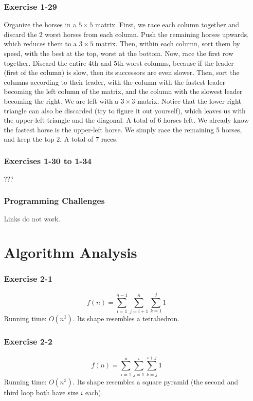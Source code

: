 \documentclass{book}
\begin{document}
\subsection*{Exercise 1-29}
Organize the horses in a $5 \times 5$ matrix. First, we race each column together and discard the 2 worst horses from each column. Push the remaining horses upwards, which reduces them to a $3 \times 5$ matrix. Then, within each column, sort them by speed, with the best at the top, worst at the bottom. Now, race the first row together. Discard the entire 4th and 5th worst columns, because if the leader (first of the column) is slow, then its successors are even slower. Then, sort the columns according to their leader, with the column with the fastest leader becoming the left column of the matrix, and the column with the slowest leader becoming the right. We are left with a $3 \times 3$ matrix. Notice that the lower-right triangle can also be discarded (try to figure it out yourself), which leaves us with the upper-left triangle and the diagonal. A total of 6 horses left. We already know the fastest horse is the upper-left horse. We simply race the remaining 5 horses, and keep the top 2. A total of 7 races.

\subsection*{Exercises 1-30 to 1-34}
???

\subsection*{Programming Challenges}
Links do not work.

\chapter{Algorithm Analysis}

\subsection*{Exercise 2-1}
$$f(n) = \sum_{i = 1}^{n - 1} \sum_{j = i + 1}^n \sum_{k = 1}^j 1$$
Running time: $O(n^3)$. Its shape resembles a tetrahedron.

\subsection*{Exercise 2-2}
$$f(n) = \sum_{i = 1}^n \sum_{j = 1}^i \sum_{k = j}^{i + j} 1$$
Running time: $O(n^3)$. Its shape resembles a square pyramid (the second and third loop both have size $i$ each).
\end{document}
